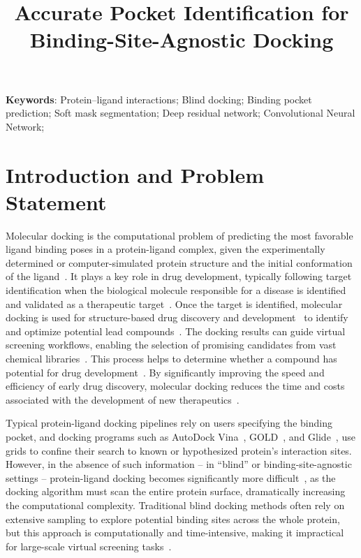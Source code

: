 \documentclass[10pt,conference]{IEEEtran}
\begin{document}
\title{Accurate Pocket Identification for Binding-Site-Agnostic Docking}






\date{\vspace{-5ex}}


\maketitle




\textbf{Keywords}: Protein–ligand interactions; Blind docking; Binding pocket prediction; Soft mask segmentation; Deep residual network; Convolutional Neural Network; 


\section{Introduction and Problem Statement}

Molecular docking is the computational problem of predicting the most favorable ligand binding poses in a protein-ligand complex, given the experimentally determined or computer-simulated protein structure and the initial conformation of the ligand~\cite{kukol2008molecular}. It plays a key role in drug development, typically following target identification when the biological molecule responsible for a disease is identified and validated as a therapeutic target~\cite{an2004comprehensive}. Once the target is identified, molecular docking is used for structure-based drug discovery and development~\cite{de2016molecular,rezaei2020deep} to identify and optimize potential lead compounds~\cite{vamathevan2019applications,saikia2019molecular}. The docking results can guide virtual screening workflows, enabling the selection of promising candidates from vast chemical libraries~\cite{zoete2009docking,lionta2014structure}. This process helps to determine whether a compound has potential for drug development~\cite{patrick2023introduction}. By significantly improving the speed and efficiency of early drug discovery, molecular docking reduces the time and costs associated with the development of new therapeutics~\cite{hernandez2013protein}.



Typical protein-ligand docking pipelines rely on users specifying the binding pocket, and docking programs such as AutoDock Vina~\cite{trott2010autodock,eberhardt2021autodock}, GOLD~\cite{verdonk2003improved}, and Glide~\cite{friesner2004glide}, use grids to confine their search to known or hypothesized protein's interaction sites. However, in the absence of such information -- in ``blind'' or binding-site-agnostic settings -- protein-ligand docking becomes significantly more difficult~\cite{grasso2022fragmented}, as the docking algorithm must scan the entire protein surface, dramatically increasing the computational complexity. Traditional blind docking methods often rely on extensive sampling to explore potential binding sites across the whole protein, but this approach is computationally and time-intensive, making it impractical for large-scale virtual screening tasks~\cite{hassan2017protein,koes2013lessons}.
\end{document}
